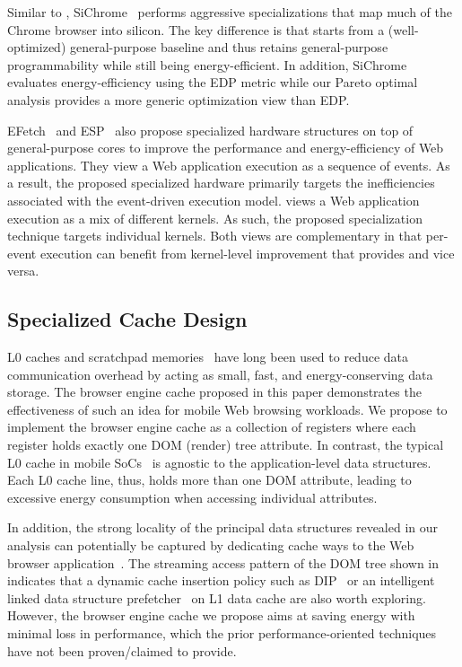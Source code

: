Similar to \webcore, SiChrome~\cite{SiChrome} performs aggressive specializations that map much of the Chrome browser into silicon. The key difference is that \webcore starts from a (well-optimized) general-purpose baseline and thus retains general-purpose programmability while still being energy-efficient. In addition, SiChrome evaluates energy-efficiency using the EDP metric while our Pareto optimal analysis provides a more generic optimization view than EDP.

EFetch~\cite{efetch} and ESP~\cite{esp} also propose specialized hardware structures on top of general-purpose cores to improve the performance and energy-efficiency of Web applications. They view a Web application execution as a sequence of events. As a result, the proposed specialized hardware primarily targets the inefficiencies associated with the event-driven execution model. \webcore views a Web application execution as a mix of different kernels. As such, the proposed specialization technique targets individual kernels. Both views are complementary in that per-event execution can benefit from kernel-level improvement that \webcore provides and vice versa.

\subsection{Specialized Cache Design}
\label{sec:arch:related:data}

L0 caches and scratchpad memories~\cite{filtercache,scratchpad} have long been used to reduce data communication overhead by acting as small, fast, and energy-conserving data storage. The browser engine cache proposed in this paper demonstrates the effectiveness of such an idea for mobile Web browsing workloads. We propose to implement the browser engine cache as a collection of registers where each register holds exactly one DOM (render) tree attribute. In contrast, the typical L0 cache in mobile SoCs~\cite{krait} is agnostic to the application-level data structures. Each L0 cache line, thus, holds more than one DOM attribute, leading to excessive energy consumption when accessing individual attributes.

In addition, the strong locality of the principal data structures revealed in our analysis can potentially be captured by dedicating cache ways to the Web browser application~\cite{BIC,WayStealing}. The streaming access pattern of the DOM tree shown in~ indicates that a dynamic cache insertion policy such as DIP~\cite{dip} or an intelligent linked data structure prefetcher~\cite{LDS} on L1 data cache are also worth exploring. However, the browser engine cache we propose aims at saving energy with minimal loss in performance, which the prior performance-oriented techniques have not been proven/claimed to provide.

